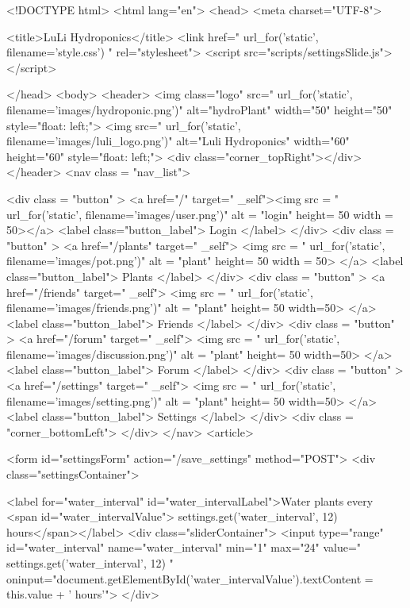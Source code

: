 \documentclass[12pt]{article} %
\begin{document}
    \begin{htmlcode}[caption={Settings Page HTML}]
    <!DOCTYPE html>
    <html lang="en">
    <head>
    <meta charset="UTF-8">
    
    <title>LuLi Hydroponics</title>
    <link href="{{ url_for('static', filename='style.css') }}" rel="stylesheet">
    <script src="scripts/settingsSlide.js"></script>
    
    </head>
    <body>
    <header>
        <img class="logo" src="{{ url_for('static', filename='images/hydroponic.png')}}" alt="hydroPlant" width="50" height="50" style="float: left;">
        <img src="{{ url_for('static', filename='images/luli_logo.png')}}" alt="Luli Hydroponics" width="60" height="60" style="float: left;">
        <div class="corner_topRight"></div>
    </header>
    <nav class = "nav_list">
          
        <div class = "button" > 
           <a href="/" target=" _self"><img src = "{{ url_for('static', filename='images/user.png')}}" alt = "login" height= 50 width = 50></a>
           <label class="button_label"> Login </label> 
        </div>
        <div class = "button" > 
           <a href="/plants" target=" _self"> <img src = "{{ url_for('static', filename='images/pot.png')}}" alt = "plant" height= 50 width = 50> </a>
           <label class="button_label"> Plants </label> 
        </div>
        <div class = "button" > 
           <a href="/friends" target=" _self"> <img src = "{{ url_for('static', filename='images/friends.png')}}" alt = "plant" height= 50 width=50> </a>
           <label class="button_label"> Friends </label> 
        </div>
        <div class = "button" > 
           <a href="/forum" target=" _self"> <img src = "{{ url_for('static', filename='images/discussion.png')}}" alt = "plant" height= 50 width=50> </a>
           <label class="button_label"> Forum </label> 
        </div>
        <div class = "button" > 
           <a href="/settings" target=" _self"> <img src = "{{ url_for('static', filename='images/setting.png')}}" alt = "plant" height= 50 width=50> </a>
           <label class="button_label"> Settings </label> 
        </div>
           <div class = "corner_bottomLeft"> </div>
       </nav>
    <article>
    
        <form id="settingsForm" action="/save_settings" method="POST">
            <div class="settingsContainer">
                
                <label for="water_interval" id="water_intervalLabel">Water plants every <span id="water_intervalValue">{{ settings.get('water_interval', 12) }} hours</span></label>
                <div class="sliderContainer">
                    <input type="range" id="water_interval" name="water_interval" min="1" max="24" value="{{ settings.get('water_interval', 12) }}" oninput="document.getElementById('water_intervalValue').textContent = this.value + ' hours'">
                </div>
        

\end{htmlcode}
\end{document}
